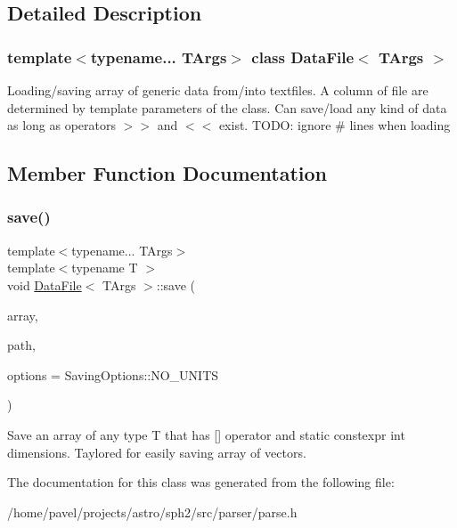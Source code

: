 \subsection{Detailed Description}
\subsubsection*{template$<$typename... T\+Args$>$\newline
class Data\+File$<$ T\+Args $>$}

Loading/saving array of generic data from/into textfiles. A column of file are determined by template parameters of the class. Can save/load any kind of data as long as operators $>$$>$ and $<$$<$ exist. T\+O\+DO\+: ignore \textquotesingle{}\#\textquotesingle{} lines when loading 

\subsection{Member Function Documentation}
\hypertarget{classDataFile_a2ed8b7e88e74a459050959b782008821}{}\label{classDataFile_a2ed8b7e88e74a459050959b782008821} 
\subsubsection{\texorpdfstring{save()}{save()}}
{\footnotesize\ttfamily template$<$typename... T\+Args$>$ \\
template$<$typename T $>$ \\
void \hyperlink{classDataFile}{Data\+File}$<$ T\+Args $>$\+::save (\begin{DoxyParamCaption}\item[{const \hyperlink{classArray}{Array}$<$ T $>$ \&}]{array,  }\item[{const std\+::string \&}]{path,  }\item[{Saving\+Options}]{options = {\ttfamily SavingOptions\+:\+:NO\+\_\+UNITS} }\end{DoxyParamCaption})\hspace{0.3cm}{\ttfamily [inline]}}

Save an array of any type T that has \mbox{[}\mbox{]} operator and static constexpr int \textquotesingle{}dimensions\textquotesingle{}. Taylored for easily saving array of vectors. 

The documentation for this class was generated from the following file\+:\begin{DoxyCompactItemize}
\item 
/home/pavel/projects/astro/sph2/src/parser/parse.\+h\end{DoxyCompactItemize}
